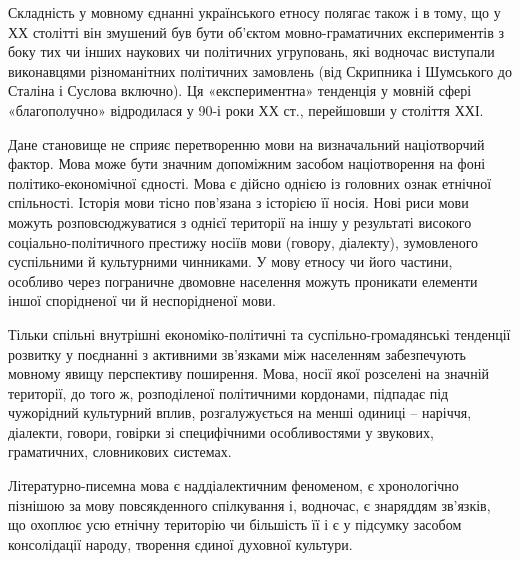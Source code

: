 \begin{itemize}
\begin{itemize}
 

Складність у мовному єднанні українського етносу полягає також і в тому, що у
ХХ столітті він змушений був бути об’єктом мовно-граматичних експериментів з
боку тих чи інших наукових чи політичних угруповань, які водночас виступали
виконавцями різноманітних політичних замовлень (від Скрипника і Шумського до
Сталіна і Суслова включно). Ця «експериментна» тенденція у мовній сфері
«благополучно» відродилася у 90-і роки ХХ ст., перейшовши у століття ХХІ.

Дане становище не сприяє перетворенню мови на визначальний націотворчий фактор.
Мова може бути значним допоміжним засобом націотворення на фоні
політико-економічної єдності. Мова є дійсно однією із головних ознак етнічної
спільності. Історія мови тісно пов’язана з історією її носія. Нові риси мови
можуть розповсюджуватися з однієї території на іншу у результаті високого
соціально-політичного престижу носіїв мови (говору, діалекту), зумовленого
суспільними й культурними чинниками. У мову етносу чи його частини, особливо
через пограничне двомовне населення можуть проникати елементи іншої спорідненої
чи й неспорідненої мови.

Тільки спільні внутрішні економіко-політичні та суспільно-громадянські
тенденції розвитку у поєднанні з активними зв’язками між населенням
забезпечують мовному явищу перспективу поширення. Мова, носії якої розселені на
значній території, до того ж, розподіленої політичними кордонами, підпадає під
чужорідний культурний вплив, розгалужується на менші одиниці – наріччя,
діалекти, говори, говірки зі специфічними особливостями у звукових,
граматичних, словникових системах.

Літературно-писемна мова є наддіалектичним феноменом, є хронологічно пізнішою
за мову повсякденного спілкування і, водночас, є знаряддям зв’язків, що охоплює
усю етнічну територію чи більшість її і є у підсумку засобом консолідації
народу, творення єдиної духовної культури.

\begin{itemize}
 


\end{itemize}
\end{itemize}
\end{itemize}
